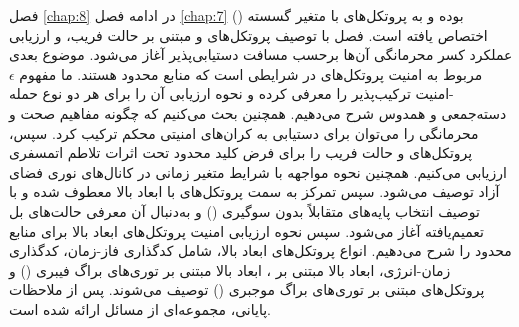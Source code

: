 فصل \ref{chap:8} در ادامه فصل \ref{chap:7} بوده و به پروتکل‌های  با متغیر گسسته () اختصاص یافته است. فصل با توصیف پروتکل‌های  و مبتنی بر حالت فریب، و ارزیابی عملکرد کسر محرمانگی آن‌ها برحسب مسافت دستیابی‌پذیر آغاز می‌شود. موضوع بعدی مربوط به امنیت پروتکل‌های  در شرایطی است که منابع محدود هستند. ما مفهوم $\epsilon$-امنیت ترکیب‌پذیر را معرفی کرده و نحوه ارزیابی آن را برای هر دو نوع حمله دسته‌جمعی و همدوس شرح می‌دهیم. همچنین بحث می‌کنیم که چگونه مفاهیم صحت و محرمانگی را می‌توان برای دستیابی به کران‌های امنیتی محکم ترکیب کرد. سپس، پروتکل‌های  و حالت فریب را برای فرض کلید محدود تحت اثرات تلاطم اتمسفری ارزیابی می‌کنیم. همچنین نحوه مواجهه با شرایط متغیر زمانی در کانال‌های نوری فضای آزاد توصیف می‌شود. سپس تمرکز به سمت پروتکل‌های  با ابعاد بالا معطوف شده و با توصیف انتخاب پایه‌های متقابلاً بدون سوگیری () و به‌دنبال آن معرفی حالت‌های بل تعمیم‌یافته آغاز می‌شود. سپس نحوه ارزیابی امنیت پروتکل‌های  ابعاد بالا برای منابع محدود را شرح می‌دهیم. انواع پروتکل‌های  ابعاد بالا، شامل کدگذاری فاز-زمان، کدگذاری زمان-انرژی،  ابعاد بالا مبتنی بر ،  ابعاد بالا مبتنی بر توری‌های براگ فیبری () و پروتکل‌های مبتنی بر توری‌های براگ موجبری () توصیف می‌شوند. پس از ملاحظات پایانی، مجموعه‌ای از مسائل ارائه شده است.

